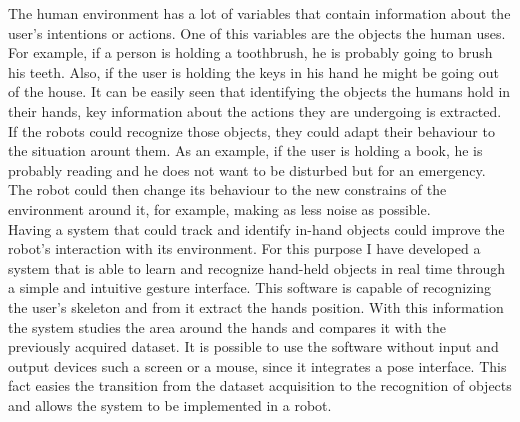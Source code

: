 The human environment has a lot of variables that contain information about the user's intentions or actions. 
One of this variables are the objects the human uses. 
For example, if a person is holding a toothbrush, he is probably going to brush his teeth. 
Also, if the user is holding the keys in his hand he might be going out of the house. 
It can be easily seen that identifying the objects the humans hold in their hands, key information about the actions they are undergoing is extracted. 
If the robots could recognize those objects, they could adapt their behaviour to the situation arount them. 
As an example, if the user is holding a book, he is probably reading and  he does not want to be disturbed but for an emergency. 
The robot could then change its behaviour to the new constrains of the environment around it, for example, making as less noise as possible. 
\\

Having a system that could track and identify in-hand objects could improve the robot's interaction with its environment.
For this purpose I have developed a system that is able to learn and recognize hand-held objects in real time through a simple and intuitive gesture interface. 
This software is capable of recognizing the user's skeleton and from it extract the hands position. 
With this information the system studies the area around the hands and compares it with the previously acquired dataset.
It is possible to use the software without input and output devices such a screen or a mouse, since it integrates a pose interface. 
This fact easies the transition from the dataset acquisition to the recognition of objects and allows the system to be implemented in a robot. 




















